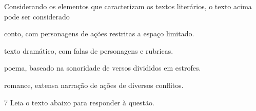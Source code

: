 Considerando os elementos que caracterizam os textos literários, o texto
acima pode ser considerado

\begin{escolha}

    \item conto, com personagens de ações restritas a espaço limitado.
    
    \item texto dramático, com falas de personagens e rubricas.  
    
    \item poema, baseado na sonoridade de versos divididos em estrofes.  
    
    \item romance, extensa narração de ações de diversos conflitos. 

\end{escolha}

\num{7} Leia o texto abaixo para responder à questão. 


